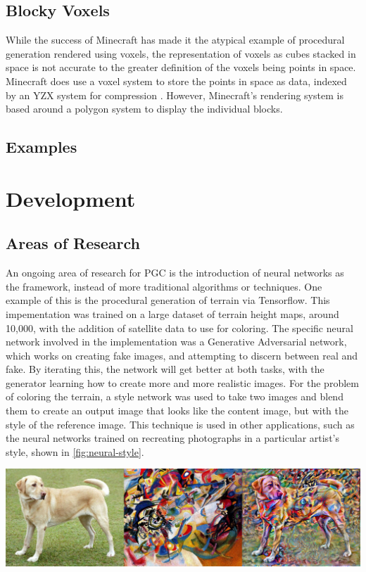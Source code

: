 \documentclass[10pt]{report}
\begin{document}
		\section{Blocky Voxels}
		While the success of Minecraft has made it the atypical example of procedural generation rendered using voxels, the representation of voxels as cubes stacked in space is not accurate to the greater definition of the voxels being points in space. Minecraft does use a voxel system to store the points in space as data, indexed by an YZX system for compression \cite{minecraft-voxel}. However, Minecraft's rendering system is based around a polygon system to display the individual blocks. 
		
		\section{Examples}
		
	
	\vspace{10pt}
	\let\clearpage\relax
	\chapter{Development}

		\section{Areas of Research}
	
		An ongoing area of research for PGC is the introduction of neural networks as the framework, instead of more traditional algorithms or techniques. One example of this is the procedural generation of terrain via Tensorflow. This impementation was trained on a large dataset of terrain height maps, around 10,000, with the addition of satellite data to use for coloring. The specific neural network involved in the implementation was a Generative Adversarial network, which works on creating fake images, and attempting to discern between real and fake. By iterating this, the network will get better at both tasks, with the generator learning how to create more and more realistic images. For the problem of coloring the terrain, a style network was used to take two images and blend them to create an output image that looks like the content image, but with the style of the reference image. This technique is used in other applications, such as the neural networks trained on recreating photographs in a particular artist's style, shown in \autoref{fig:neural-style}. 
		
		\begin{minipage}{\textwidth}
			\centering
			\includegraphics[scale=.3]{stylized-image}
			\label{fig:neural-style}
		\end{minipage}
	
\end{document}
